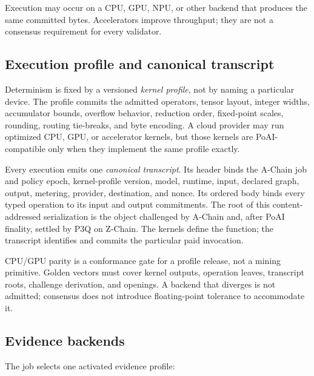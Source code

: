 Execution may occur on a CPU, GPU, NPU, or other backend that produces the same
committed bytes. Accelerators improve throughput; they are not a consensus
requirement for every validator.

\subsection{Execution profile and canonical transcript}

Determinism is fixed by a versioned \emph{kernel profile}, not by naming a
particular device. The profile commits the admitted operators, tensor layout,
integer widths, accumulator bounds, overflow behavior, reduction order,
fixed-point scales, rounding, routing tie-breaks, and byte encoding. A cloud
provider may run optimized CPU, GPU, or accelerator kernels, but those kernels
are PoAI-compatible only when they implement the same profile exactly.

Every execution emits one \emph{canonical transcript}. Its header binds the
A-Chain job and policy epoch, kernel-profile version, model, runtime, input,
declared graph, output, metering, provider, destination, and nonce. Its ordered
body binds every typed operation to its input and output commitments. The root
of this content-addressed serialization is the object challenged by A-Chain and,
after PoAI finality, settled by P3Q on Z-Chain. The kernels define the function;
the transcript identifies and commits the particular paid invocation.

CPU/GPU parity is a conformance gate for a profile release, not a mining
primitive. Golden vectors must cover kernel outputs, operation leaves,
transcript roots, challenge derivation, and openings. A backend that diverges is
not admitted; consensus does not introduce floating-point tolerance to
accommodate it.

\subsection{Evidence backends}

The job selects one activated evidence profile:


